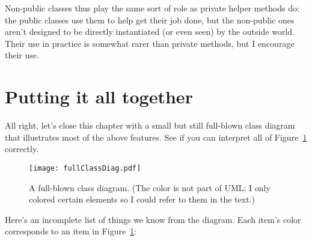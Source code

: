 Non-public classes thus play the same sort of role as private helper methods
do: the public classes use them to help get their job done, but the non-public
ones aren't designed to be directly instantiated (or even seen) by the outside
world. Their use in practice is somewhat rarer than private methods, but I
encourage their use.


\pagebreak
\section{Putting it all together}

All right, let's close this chapter with a small but still full-blown class
diagram that illustrates most of the above features. See if you can interpret
all of Figure~\ref{fig:fullClassDiag} correctly.

\begin{figure}[ht]
\centering
\texttt{[image: fullClassDiag.pdf]}   %
\caption{A full-blown class diagram. (The color is not part of UML; I only
colored certain elements so I could refer to them in the text.)}
\label{fig:fullClassDiag}
\end{figure}

Here's an incomplete list of things we know from the diagram. Each item's
color corresponds to an item in Figure~\ref{fig:fullClassDiag}:

